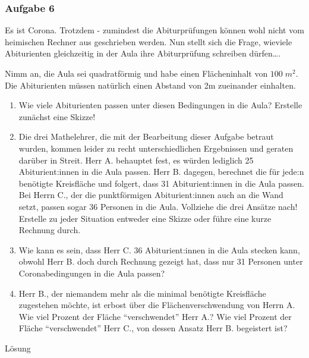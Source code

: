 \documentclass[
  ngerman,
]{book}
\begin{document}
\hypertarget{aufgabe-6-1}{%
\subsubsection*{Aufgabe 6}\label{aufgabe-6-1}}

Es ist Corona. Trotzdem - zumindest die Abiturprüfungen können wohl nicht vom heimischen Rechner aus geschrieben werden. Nun stellt sich die Frage, wieviele Abiturienten gleichzeitig in der Aula ihre Abiturprüfung schreiben dürfen\ldots.

Nimm an, die Aula sei quadratförmig und habe einen Flächeninhalt von \(100\;m^2\). Die Abiturienten müssen natürlich einen Abstand von 2m zueinander einhalten.

\begin{enumerate}
\def\labelenumi{\alph{enumi})}
\item
  Wie viele Abiturienten passen unter diesen Bedingungen in die Aula? Erstelle zunächst eine Skizze!
\item
  Die drei Mathelehrer, die mit der Bearbeitung dieser Aufgabe betraut wurden, kommen leider zu recht unterschiedlichen Ergebnissen und geraten darüber in Streit. Herr A. behauptet fest, es würden lediglich 25 Abiturient:innen in die Aula passen. Herr B. dagegen, berechnet die für jede:n benötigte Kreisfläche und folgert, dass 31 Abiturient:innen in die Aula passen. Bei Herrn C., der die punktförmigen Abiturient:innen auch an die Wand setzt, passen sogar 36 Personen in die Aula. Vollziehe die drei Ansätze nach! Erstelle zu jeder Situation entweder eine Skizze oder führe eine kurze Rechnung durch.
\item
  Wie kann es sein, dass Herr C. 36 Abiturient:innen in die Aula stecken kann, obwohl Herr B. doch durch Rechnung gezeigt hat, dass nur 31 Personen unter Coronabedingungen in die Aula passen?
\item
  Herr B., der niemandem mehr als die minimal benötigte Kreisfläche zugestehen möchte, ist erbost über die Flächenverschwendung von Herrn A. Wie viel Prozent der Fläche ``verschwendet'' Herr A.? Wie viel Prozent der Fläche ``verschwendet'' Herr C., von dessen Ansatz Herr B. begeistert ist?
\end{enumerate}

Lösung

\hypertarget{section-59}{%
\subsubsection*{}\label{section-59}}
\end{document}
